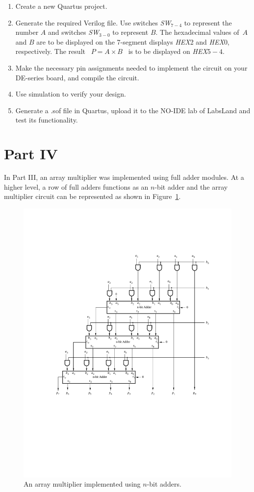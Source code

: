 \documentclass[epsfig,10pt,fullpage]{article}
\begin{document}
\begin{enumerate}
\item Create a new Quartus project.
\item Generate the required Verilog file. Use switches {\it SW}$_{7-4}$ to represent the 
number $A$ and switches {\it SW}$_{3-0}$ to represent $B$. The hexadecimal values of~$A$ 
and $B$ are to be displayed on the 7-segment displays {\it HEX}2 and {\it HEX}0, respectively.
The result ~$P = A \times B$~ is to be displayed on {\it HEX}$5-4$.
\item Make the necessary pin assignments needed to implement the circuit on your
DE-series board, and compile the circuit.
\item Use simulation to verify your design.
\item Generate a .sof file in Quartus, upload it to the NO-IDE lab of LabsLand and test its functionality.
\end{enumerate}

\section*{Part IV}
In Part III, an array multiplier was implemented using full adder modules. At a higher level, a row of full adders functions as an $n$-bit adder and the array multiplier circuit can be represented as shown in Figure~\ref{fig:array_mult_adders}.

\begin{figure}[H]
\centerline{
\includegraphics{figures/array_mult_adders}}
\caption{An array multiplier implemented using $n$-bit adders.}
\label{fig:array_mult_adders}
\end{figure}
\end{document}
